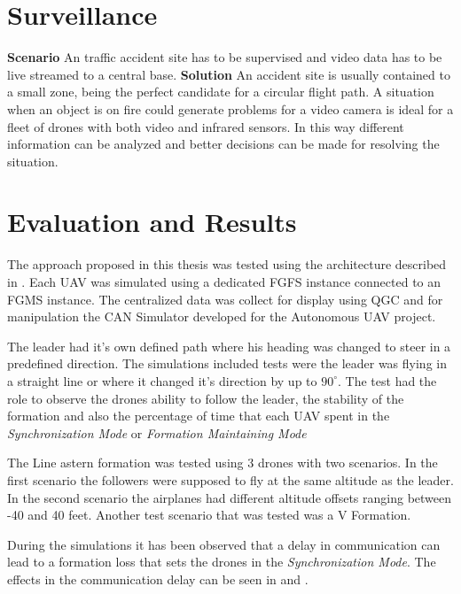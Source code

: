\section{Surveillance}
\textbf{Scenario} \newline
An traffic accident site has to be supervised and video data has to be live
streamed to a central base.
\textbf{Solution}
An accident site is usually contained to a small zone, being the perfect
candidate for a circular flight path. A situation when an object is on fire could
generate problems for a video camera is ideal for a fleet of drones with 
both video and infrared sensors. In this way different information can be 
analyzed and better decisions can be made for resolving the situation.

\section{Evaluation and Results}
The approach proposed in this thesis was tested using the architecture described in
. Each UAV was simulated
using a dedicated FGFS instance connected to an FGMS instance. The centralized
data was collect for display using QGC and for manipulation the CAN Simulator
developed for the Autonomous UAV project.

The leader had it's own defined path where his heading was changed to steer in
a predefined direction. The simulations included tests were the leader
was flying in a straight line or where it changed it's direction by up to 
$90^{\circ}$. The test had the role to observe the drones ability to follow
the leader,  the stability of the formation and also the percentage of time
that each UAV spent in the \textit{Synchronization Mode} or \textit{Formation Maintaining
  Mode}
  

The Line astern formation was tested using 3 drones with two scenarios. In 
the first scenario the followers were supposed to fly at the same altitude
as the leader. In the second scenario the airplanes had different altitude offsets
ranging between -40 and 40 feet. Another test scenario that was tested was 
a V Formation.

During the simulations it has been observed that a delay in communication 
can lead to a formation loss that sets the drones in the \textit{Synchronization Mode}.
The effects in the communication delay can be seen in 
and .

